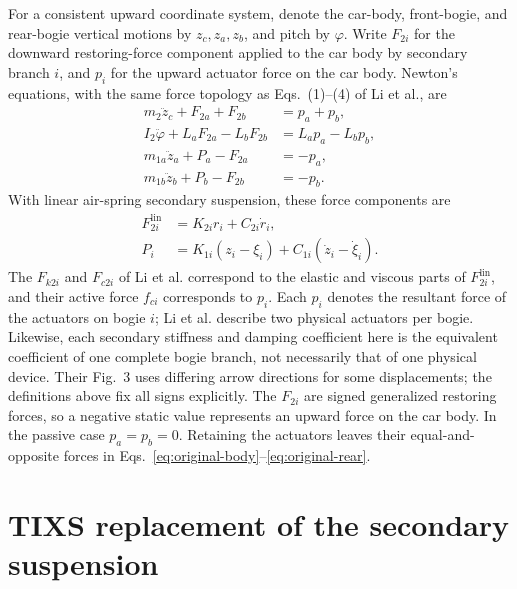 \documentclass[a4paper,12pt]{article}
\numberwithin{equation}{section}
\begin{document}
For a consistent upward coordinate system, denote the car-body, front-bogie, and rear-bogie vertical motions by $z_c,z_a,z_b$, and pitch by $\varphi$. Write $F_{2i}$ for the downward restoring-force component applied to the car body by secondary branch $i$, and $p_i$ for the upward actuator force on the car body. Newton's equations, with the same force topology as Eqs.~(1)--(4) of Li et al., are
\begin{align}
m_2\ddot z_c+F_{2a}+F_{2b}
 &=p_a+p_b,\label{eq:original-body}\\
I_2\ddot\varphi+L_aF_{2a}-L_bF_{2b}
 &=L_ap_a-L_bp_b,\label{eq:original-pitch}\\
m_{1a}\ddot z_a+P_a-F_{2a}
 &=-p_a,\label{eq:original-front}\\
m_{1b}\ddot z_b+P_b-F_{2b}
 &=-p_b.\label{eq:original-rear}
\end{align}
With linear air-spring secondary suspension, these force components are
\begin{equation}
\begin{aligned}
F_{2i}^{\mathrm{lin}}
 &=K_{2i}r_i+C_{2i}\dot r_i,\\
P_i
 &=K_{1i}(z_i-\xi_i)
   +C_{1i}(\dot z_i-\dot\xi_i).
\end{aligned}
\label{eq:original-constitutive}
\end{equation}
The $F_{k2i}$ and $F_{c2i}$ of Li et al. correspond to the elastic and viscous parts of $F_{2i}^{\mathrm{lin}}$, and their active force $f_{ci}$ corresponds to $p_i$. Each $p_i$ denotes the resultant force of the actuators on bogie $i$; Li et al. describe two physical actuators per bogie. Likewise, each secondary stiffness and damping coefficient here is the equivalent coefficient of one complete bogie branch, not necessarily that of one physical device. Their Fig.~3 uses differing arrow directions for some displacements; the definitions above fix all signs explicitly. The $F_{2i}$ are signed generalized restoring forces, so a negative static value represents an upward force on the car body. In the passive case $p_a=p_b=0$. Retaining the actuators leaves their equal-and-opposite forces in Eqs.~\eqref{eq:original-body}--\eqref{eq:original-rear}.

\section{TIXS replacement of the secondary suspension}
\end{document}
